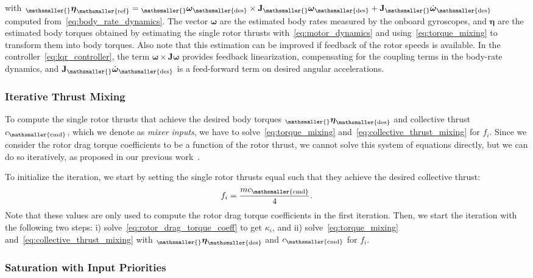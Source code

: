\documentclass[10pt,a4paper,fleqn]{article}
\newcommand{\bVec}[1]{\mathbf{#1}}
\newcommand{\vect}[3]{{_{\mathsmaller{\mathrm{#2}}}\mathbf{#1}_{\mathsmaller{\mathrm{#3}}}}} %
\newcommand{\vectdot}[3]{{_{\mathsmaller{\mathrm{#2}}}\dot{\mathbf{#1}}_{\mathsmaller{\mathrm{#3}}}}} %
\newcommand{\bodyrate}[0]{\omega} %
\newcommand{\bodyrates}[0]{\boldsymbol{\bodyrate}} %
\newcommand{\inertia}[0]{\bVec{J}} %
\newcommand{\bodytorque}[0]{\eta}
\newcommand{\bodytorques}[0]{\boldsymbol{\bodytorque}}
\newcommand{\thrust}[0]{c} %
\newcommand{\rotthrust}[1]{f_{#1}}
\newcommand{\torquecoeff}[1]{\kappa_{#1}}
\newcommand{\mass}[0]{m}
\begin{document}
%
with ${\vect{\bodytorques}{}{ref} = \vect{\bodyrates}{}{des} \times \inertia \vect{\bodyrates}{}{des} + \inertia \vectdot{\bodyrates}{}{des}}$ computed from~\eqref{eq:body_rate_dynamics}.
The vector $\bodyrates$ are the estimated body rates measured by the onboard gyroscopes, and $\bodytorques$ are the estimated body torques obtained by estimating the single rotor thrusts with~\eqref{eq:motor_dynamics} and using~\eqref{eq:torque_mixing} to transform them into body torques.
Also note that this estimation can be improved if feedback of the rotor speeds is available.
In the controller~\eqref{eq:lqr_controller}, the term ${\bodyrates \times \inertia \bodyrates}$ provides feedback linearization, compensating for the coupling terms in the body-rate dynamics, and ${\inertia \vectdot{\bodyrates}{}{des}}$ is a feed-forward term on desired angular accelerations.

\subsubsection{Iterative Thrust Mixing} \label{sec:mixer}

To compute the single rotor thrusts that achieve the desired body torques $\vect{\bodytorques}{}{des}$ and collective thrust $\thrust_{\mathsmaller{\mathrm{cmd}}}$, which we denote as \emph{mixer inputs}, we have to solve~\eqref{eq:torque_mixing} and~\eqref{eq:collective_thrust_mixing} for $\rotthrust{i}$.
Since we consider the rotor drag torque coefficients to be a function of the rotor thrust, we cannot solve this system of equations directly, but we can do so iteratively, as proposed in our previous work~\cite{Faessler17ral}.

To initialize the iteration, we start by setting the single rotor thrusts equal such that they achieve the desired collective thrust:
%
\begin{equation}
	\rotthrust{i} = \frac{\mass \thrust_{\mathsmaller{\mathrm{cmd}}}}{4}.
\end{equation}
%
Note that these values are only used to compute the rotor drag torque coefficients in the first iteration.
Then, we start the iteration with the following two steps: i) solve~\eqref{eq:rotor_drag_torque_coeff} to get $\torquecoeff{i}$, and ii) solve~\eqref{eq:torque_mixing} and~\eqref{eq:collective_thrust_mixing} with $\vect{\bodytorques}{}{des}$ and $\thrust_{\mathsmaller{\mathrm{cmd}}}$ for $\rotthrust{i}$.

\subsubsection{Saturation with Input Priorities}
\end{document}

